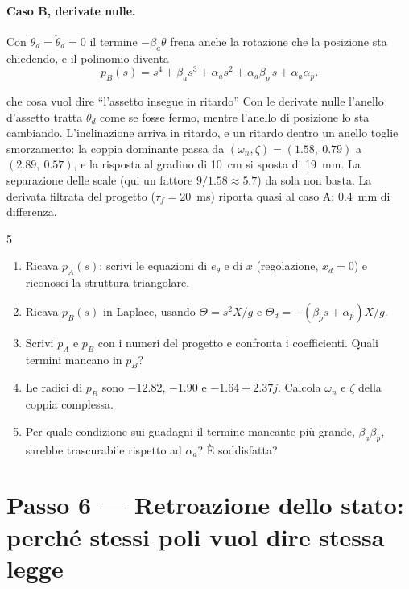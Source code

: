 \documentclass[11pt,a4paper]{article}
\begin{document}
\paragraph{Caso B, derivate nulle.} Con $\dot\theta_d = \ddot\theta_d = 0$ il termine $-\beta_a\dot\theta$ frena anche la rotazione che la posizione sta chiedendo, e il polinomio diventa
\[
p_B(s) = s^4 + \beta_a s^3 + \alpha_a s^2 + \alpha_a\beta_p\, s + \alpha_a\alpha_p .
\]

\begin{fisica}{che cosa vuol dire ``l'assetto insegue in ritardo''}
Con le derivate nulle l'anello d'assetto tratta $\theta_d$ come se fosse fermo, mentre l'anello di posizione lo sta cambiando. L'inclinazione arriva in ritardo, e un ritardo dentro un anello toglie smorzamento: la coppia dominante passa da $(\omega_n, \zeta) = (1.58,\ 0.79)$ a $(2.89,\ 0.57)$, e la risposta al gradino di 10~cm si sposta di 19~mm. La separazione delle scale (qui un fattore $9/1.58 \approx 5.7$) da sola non basta. La derivata filtrata del progetto ($\tau_f = 20$~ms) riporta quasi al caso A: 0.4~mm di differenza.
\end{fisica}

\begin{esercizio}{5}
\begin{enumerate}[label=(\alph*)]
  \item Ricava $p_A(s)$: scrivi le equazioni di $e_\theta$ e di $x$ (regolazione, $x_d = 0$) e riconosci la struttura triangolare.
  \item Ricava $p_B(s)$ in Laplace, usando $\Theta = s^2 X/g$ e $\Theta_d = -(\beta_p s + \alpha_p)X/g$.
  \item Scrivi $p_A$ e $p_B$ con i numeri del progetto e confronta i coefficienti. Quali termini mancano in $p_B$?
  \item Le radici di $p_B$ sono $-12.82$, $-1.90$ e $-1.64 \pm 2.37j$. Calcola $\omega_n$ e $\zeta$ della coppia complessa.
  \item Per quale condizione sui guadagni il termine mancante più grande, $\beta_a\beta_p$, sarebbe trascurabile rispetto ad $\alpha_a$? È soddisfatta?
\end{enumerate}
\end{esercizio}

\section{Passo 6 --- Retroazione dello stato: perché stessi poli vuol dire stessa legge}
\end{document}
